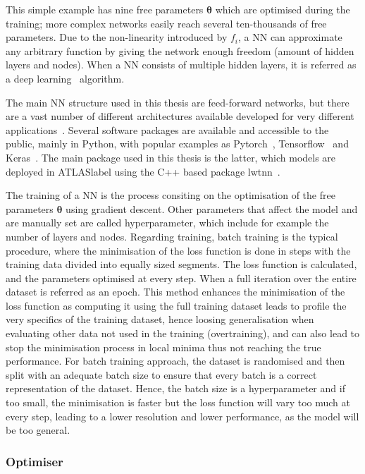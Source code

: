 This simple example has nine free parameters $\boldsymbol{\theta}$ which are optimised during the training; more complex networks easily reach several ten-thousands of free parameters. Due to the non-linearity introduced by $f_i$, a NN can approximate any arbitrary function by giving the network enough freedom (amount of hidden layers and nodes). When a NN consists of multiple hidden layers, it is referred as a deep learning~\cite{Goodfellow-et-al-2016} algorithm.

The main NN structure used in this thesis are feed-forward networks, but there are a vast number of different architectures available developed for very different applications~\cite{livingreview}. Several software packages are available and accessible to the public,  mainly in Python, with popular examples as Pytorch~\cite{NEURIPS2019_9015}, Tensorflow~\cite{tensorflow2015-whitepaper} and Keras~\cite{chollet2015keras}. The main package used in this thesis is the latter, which models are deployed in \acrshort{ATLASlabel} using the C++ based package lwtnn~\cite{lwtnn}.

The training of a NN is the process consiting on the optimisation of the free parameters $\boldsymbol{\theta}$ using gradient descent. Other parameters that affect the model and are manually set are called hyperparameter, which include for example the number of layers and nodes. Regarding training, batch training is the typical procedure, where the minimisation of the loss function is done in steps with the training data divided into equally sized segments. The loss function is calculated, and the parameters optimised at every step. When a full iteration over the entire dataset is referred as an epoch. This method enhances the minimisation of the loss function as computing it using the full training dataset leads to profile the very specifics of the training dataset, hence loosing generalisation when evaluating other data not used in the training (overtraining), and can also lead to stop the minimisation process in local minima thus not reaching the true performance. For batch training approach, the dataset is randomised and then split with an adequate batch size to ensure that every batch is a correct representation of the dataset. Hence, the batch size is a hyperparameter and if too small, the minimisation is faster but the loss function will vary too much at every step, leading to a lower resolution and lower performance, as the model will be too general. 

\subsubsection{Optimiser}


